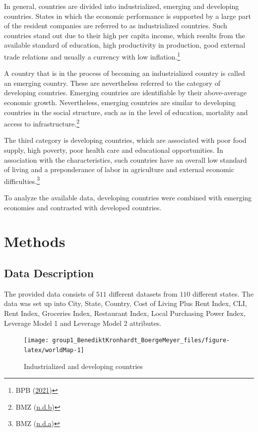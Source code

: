 \documentclass[
  11pt,
  a4paper,
  twoside]{scrbook}
\begin{document}
In general, countries are divided into industrialized, emerging and developing countries. States in which the economic performance is supported by a large part of the resident companies are referred to as industrialized countries. Such countries stand out due to their high per capita income, which results from the available standard of education, high productivity in production, good external trade relations and usually a currency with low inflation.\footnote{BPB (\protect\hyperlink{ref-bpd}{2021})}

A country that is in the process of becoming an industrialized country is called an emerging country. These are nevertheless referred to the category of developing countries. Emerging countries are identifiable by their above-average economic growth. Nevertheless, emerging countries are similar to developing countries in the social structure, such as in the level of education, mortality and access to infrastructure.\footnote{BMZ (\protect\hyperlink{ref-bmz}{n.d.b})}

The third category is developing countries, which are associated with poor food supply, high poverty, poor health care and educational opportunities. In association with the characteristics, such countries have an overall low standard of living and a preponderance of labor in agriculture and external economic difficulties.\footnote{BMZ (\protect\hyperlink{ref-bmzentwicklung}{n.d.a})}

To analyze the available data, developing countries were combined with emerging economies and contrasted with developed countries.

\hypertarget{methods}{%
\chapter{Methods}\label{methods}}

\hypertarget{data-description}{%
\section{Data Description}\label{data-description}}

The provided data consists of \(511\) different datasets from \(110\) different states. The data was set up into City, State, Country, Cost of Living Plus Rent Index, CLI, Rent Index, Groceries Index, Restaurant Index, Local Purchasing Power Index, Leverage Model 1 and Leverage Model 2 attributes.

\begin{figure}

{\centering \texttt{[image: group1\_BenediktKronhardt\_BoergeMeyer\_files/figure-latex/worldMap-1]} 

}

\caption{Industrialized and developing countries}\label{fig:worldMap}
\end{figure}
\end{document}
